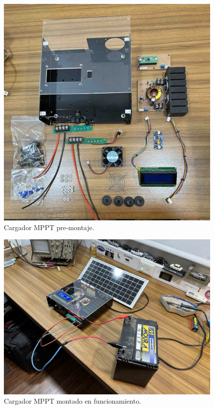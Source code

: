 \begin{figure}[H]
    \centering
    \includegraphics[width=0.6\linewidth]{informes/IMG_9388.jpg}
    \caption{Cargador MPPT pre-montaje.}
\end{figure}

\begin{figure}[H]
    \centering
    \includegraphics[width=0.6\linewidth]{informes/IMG_9390.jpg}
    \caption{Cargador MPPT montado en funcionamiento.}
\end{figure}

